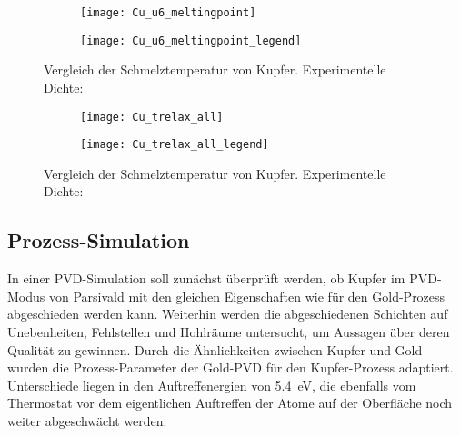 \begin{figure}[H]
  \centering
  \captionsetup[subfigure]{singlelinecheck=false}
  \begin{subfigure}[c]{10cm}
    \texttt{[image: Cu\_u6\_meltingpoint]}
  \end{subfigure}
  \begin{subfigure}[c]{4cm}
    \texttt{[image: Cu\_u6\_meltingpoint\_legend]}
    \vspace{1.5em}
  \end{subfigure}
  \hfill
  \caption[Vergleich der Schmelztemperatur von Kupfer]{
    Vergleich der Schmelztemperatur von Kupfer.
    Experimentelle Dichte:~\cite{brillo_density_2006}
  }
  \label{fig:copperthermo}
\end{figure}

\begin{figure}[H]
  \centering
  \captionsetup[subfigure]{singlelinecheck=false}
  \begin{subfigure}[c]{9.4cm}
    \texttt{[image: Cu\_trelax\_all]}
  \end{subfigure}
  \begin{subfigure}[c]{4.7cm}
    \texttt{[image: Cu\_trelax\_all\_legend]}
    \vspace{1.5em}
  \end{subfigure}
  \hfill
  \caption[Vergleich der Schmelztemperatur von Kupfer]{
    Vergleich der Schmelztemperatur von Kupfer.
    Experimentelle Dichte:~\cite{brillo_density_2006}
  }
  \label{fig:copperthermo2}
\end{figure}

\subsection{Prozess-Simulation}
\label{coppersimulation}

In einer PVD-Simulation soll zunächst überprüft werden, ob Kupfer im PVD-Modus von Parsivald mit den gleichen Eigenschaften wie für den Gold-Prozess abgeschieden werden kann.
Weiterhin werden die abgeschiedenen Schichten auf Unebenheiten, Fehlstellen und Hohlräume untersucht, um Aussagen über deren Qualität zu gewinnen.
Durch die Ähnlichkeiten zwischen Kupfer und Gold wurden die Prozess-Parameter der Gold-PVD für den Kupfer-Prozess adaptiert.
Unterschiede liegen in den Auftreffenergien von \SI{5.4}{\electronvolt}, die ebenfalls vom Thermostat vor dem eigentlichen Auftreffen der Atome auf der Oberfläche noch weiter abgeschwächt werden.

